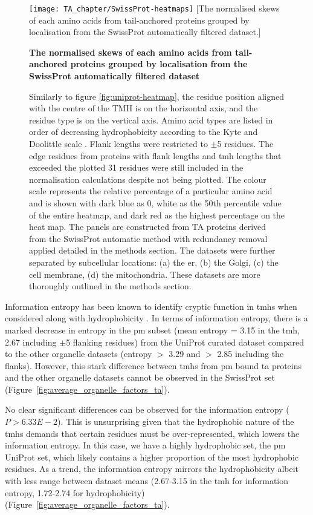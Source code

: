 \begin{figure}
\centering
\texttt{[image: TA\_chapter/SwissProt-heatmaps]}
[The normalised skews of each amino acids from tail\--anchored proteins grouped by localisation from the SwissProt automatically filtered dataset.]
{\textbf{The normalised skews of each amino acids from tail\--anchored proteins grouped by localisation from the SwissProt automatically filtered dataset}

Similarly to figure \ref{fig:uniprot-heatmap}, the residue position aligned with the centre of the TMH is on the horizontal axis, and the residue type is on the vertical axis.
Amino acid types are listed in order of decreasing hydrophobicity according to the Kyte and Doolittle scale \cite{Kyte1982}.
Flank lengths were restricted to $\pm$5 residues.
The edge residues from proteins with flank lengths and \gls{tmh} lengths that exceeded the plotted 31 residues were still included in the normalisation calculations despite not being plotted.
The colour scale represents the relative percentage of a particular amino acid and is shown with dark blue as 0, white as the 50th percentile value of the entire heatmap, and dark red as the highest percentage on the heat map.
The panels are constructed from TA proteins derived from the SwissProt automatic method with redundancy removal applied detailed in the methods section.
The datasets were further separated by subcellular locations: (a) the \gls{er}, (b) the Golgi, (c) the cell membrane, (d) the mitochondria.
These datasets are more thoroughly outlined in the methods section.
}

\label{fig:swissprot-heatmap}
\end{figure}

Information entropy has been known to identify cryptic function in \gls{tmh}s when considered along with hydrophobicity \cite{Wong2011, Wong2012}.
In terms of information entropy, there is a marked decrease in entropy in the \gls{pm} subset (mean entropy = 3.15 in the \gls{tmh}, 2.67 including $\pm$5 flanking residues) from the UniProt curated dataset compared to the other organelle datasets (entropy $>$ 3.29 and $>$ 2.85 including the flanks).
However, this stark difference between \gls{tmh}s from \gls{pm} bound \gls{ta} proteins and the other organelle datasets cannot be observed in the SwissProt set (Figure~\ref{fig:average_organelle_factors_ta}).

No clear significant differences can be observed for the information entropy ($P>6.33E-2$).
This is unsurprising given that the hydrophobic nature of the \gls{tmh}s demands that certain residues must be over-represented, which lowers the information entropy.
In this case, we have a highly hydrophobic set, the \gls{pm} UniProt set, which likely contains a higher proportion of the most hydrophobic residues.
As a trend, the information entropy mirrors the hydrophobicity albeit with less range between dataset means (2.67-3.15 in the \gls{tmh} for information entropy, 1.72-2.74 for hydrophobicity)(Figure~\ref{fig:average_organelle_factors_ta}).


